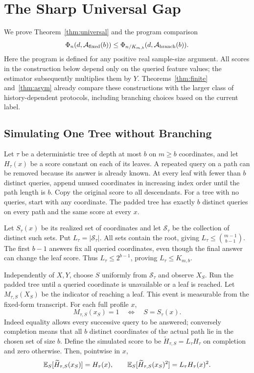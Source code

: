 \section{The Sharp Universal Gap}\label{app:universal}
We prove Theorem~\ref{thm:universal} and the program comparison
\begin{equation}
 \Phi_n(d,\mathcal A_{\rm fixed}(b))
 \le \Phi_{n/K_{m,b}}(d,\mathcal A_{\rm branch}(b)).
 \label{eq:programsimulation}
\end{equation}
Here the program is defined for any positive real sample-size argument.
All scores in the construction below depend only on the queried feature values; the estimator subsequently multiplies them by $Y$. Theorems~\ref{thm:finite} and~\ref{thm:asym} already compare these constructions with the larger class of history-dependent protocols, including branching choices based on the current label.

\subsection{Simulating One Tree without Branching}
Let $\tau$ be a deterministic tree of depth at most $b$ on $m\ge b$ coordinates, and let $H_\tau(x)$ be a score constant on each of its leaves. A repeated query on a path can be removed because its answer is already known. At every leaf with fewer than $b$ distinct queries, append unused coordinates in increasing index order until the path length is $b$. Copy the original score to all descendants. For a tree with no queries, start with any coordinate. The padded tree has exactly $b$ distinct queries on every path and the same score at every $x$.

Let $S_\tau(x)$ be its realized set of coordinates and let $\mathcal S_\tau$ be the collection of distinct such sets. Put $L_\tau=|\mathcal S_\tau|$. All sets contain the root, giving $L_\tau\le\binom{m-1}{b-1}$. The first $b-1$ answers fix all queried coordinates, even though the final answer can change the leaf score. Thus $L_\tau\le2^{b-1}$, proving $L_\tau\le K_{m,b}$.

Independently of $X,Y$, choose $S$ uniformly from $\mathcal S_\tau$ and observe $X_S$. Run the padded tree until a queried coordinate is unavailable or a leaf is reached. Let $M_{\tau,S}(X_S)$ be the indicator of reaching a leaf. This event is measurable from the fixed-form transcript. For each full profile $x$,
\[
 M_{\tau,S}(x_S)=1\quad\Longleftrightarrow\quad S=S_\tau(x).
\]
Indeed equality allows every successive query to be answered; conversely completion means that all $b$ distinct coordinates of the actual path lie in the chosen set of size $b$. Define the simulated score to be $\widetilde H_{\tau,S}=L_\tau H_\tau$ on completion and zero otherwise. Then, pointwise in $x$,
\begin{equation}
 \mathbb{E}_S[\widetilde H_{\tau,S}(x_S)]=H_\tau(x),\qquad
 \mathbb{E}_S[\widetilde H_{\tau,S}(x_S)^2]=L_\tau H_\tau(x)^2.
 \label{eq:simulate-moments}
\end{equation}

